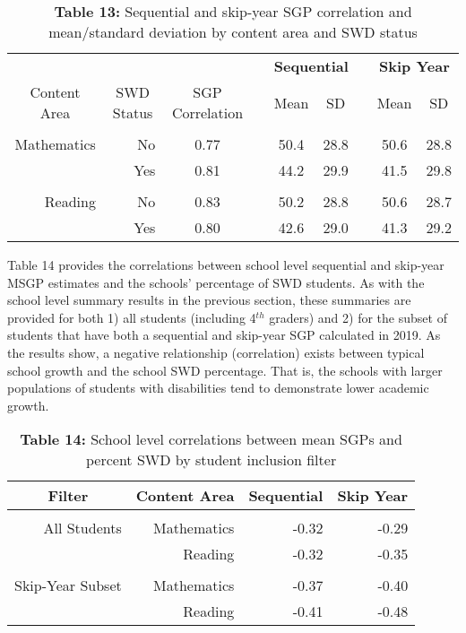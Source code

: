 \documentclass[12pt]{article}
\begin{document}
\begin{table}[H]
\caption*{\textbf{Table 13:} Sequential and skip-year SGP correlation and mean/standard deviation by content area and SWD status\label{table13}} 
\begin{center}
\begin{tabular}{rrccccccc}
\hline\hline
\multicolumn{3}{c}{\bfseries }&\multicolumn{1}{c}{\bfseries }&\multicolumn{2}{c}{\bfseries Sequential}&\multicolumn{1}{c}{\bfseries }&\multicolumn{2}{c}{\bfseries Skip Year}\tabularnewline
\cline{5-6} \cline{8-9}
\multicolumn{1}{c}{Content Area}&\multicolumn{1}{c}{SWD Status}&\multicolumn{1}{c}{SGP Correlation}&\multicolumn{1}{c}{}&\multicolumn{1}{c}{Mean}&\multicolumn{1}{c}{SD}&\multicolumn{1}{c}{}&\multicolumn{1}{c}{Mean}&\multicolumn{1}{c}{SD}\tabularnewline
\hline
&&&&&&&&\tabularnewline
Mathematics&No&0.77&&50.4&28.8&&50.6&28.8\tabularnewline
&Yes&0.81&&44.2&29.9&&41.5&29.8\tabularnewline
\hline
&&&&&&&&\tabularnewline
Reading&No&0.83&&50.2&28.8&&50.6&28.7\tabularnewline
&Yes&0.80&&42.6&29.0&&41.3&29.2\tabularnewline
\hline
\end{tabular}\end{center}
\end{table}

Table 14 provides the correlations between school level sequential and
skip-year MSGP estimates and the schools' percentage of SWD students. As
with the school level summary results in the previous section, these
summaries are provided for both 1) all students (including 4\(^{th}\)
graders) and 2) for the subset of students that have both a sequential
and skip-year SGP calculated in 2019. As the results show, a negative
relationship (correlation) exists between typical school growth and the
school SWD percentage. That is, the schools with larger populations of
students with disabilities tend to demonstrate lower academic growth.

\begin{table}[H]
\caption*{\textbf{Table 14:} School level correlations between mean SGPs and percent SWD by student inclusion filter\label{table14}} 
\begin{center}
\begin{tabular}{rrrr}
\hline\hline
\multicolumn{1}{c}{Filter}&\multicolumn{1}{c}{Content Area}&\multicolumn{1}{c}{Sequential}&\multicolumn{1}{c}{Skip Year}\tabularnewline
\hline
&&&\tabularnewline
All Students&Mathematics&-0.32&-0.29\tabularnewline
&Reading&-0.32&-0.35\tabularnewline
\hline
&&&\tabularnewline
Skip-Year Subset&Mathematics&-0.37&-0.40\tabularnewline
&Reading&-0.41&-0.48\tabularnewline
\hline
\end{tabular}\end{center}
\end{table}
\end{document}
